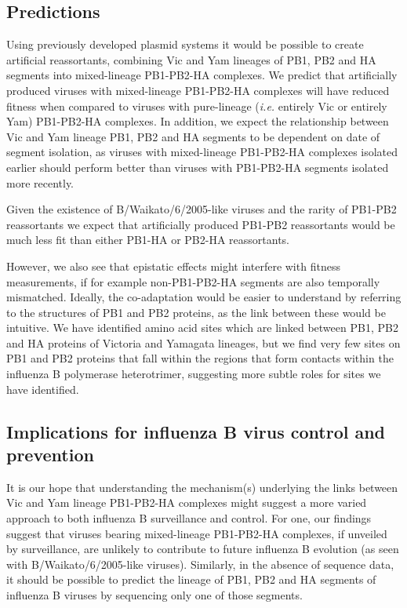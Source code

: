 \documentclass[11pt,oneside,letterpaper]{article}
\begin{document}
\subsection*{Predictions}
Using previously developed plasmid systems \cite{hoffmann2002} it would be possible to create artificial reassortants, combining Vic and Yam lineages of PB1, PB2 and HA segments into mixed-lineage PB1-PB2-HA complexes.
We predict that artificially produced viruses with mixed-lineage PB1-PB2-HA complexes will have reduced fitness when compared to viruses with pure-lineage (\textit{i.e.} entirely Vic or entirely Yam) PB1-PB2-HA complexes.
In addition, we expect the relationship between Vic and Yam lineage PB1, PB2 and HA segments to be dependent on date of segment isolation, as viruses with mixed-lineage PB1-PB2-HA complexes isolated earlier should perform better than viruses with PB1-PB2-HA segments isolated more recently.

Given the existence of B/Waikato/6/2005-like viruses and the rarity of PB1-PB2 reassortants we expect that artificially produced PB1-PB2 reassortants would be much less fit than either PB1-HA or PB2-HA reassortants.

However, we also see that epistatic effects might interfere with fitness measurements, if for example non-PB1-PB2-HA segments are also temporally mismatched.
Ideally, the co-adaptation would be easier to understand by referring to the structures of PB1 and PB2 proteins, as the link between these would be intuitive.
We have identified amino acid sites which are linked between PB1, PB2 and HA proteins of Victoria and Yamagata lineages, but we find very few sites on PB1 and PB2 proteins that fall within the regions that form contacts within the influenza B polymerase heterotrimer, suggesting more subtle roles for sites we have identified.

\subsection*{Implications for influenza B virus control and prevention}
It is our hope that understanding the mechanism(s) underlying the links between Vic and Yam lineage PB1-PB2-HA complexes might suggest a more varied approach to both influenza B surveillance and control.
For one, our findings suggest that viruses bearing mixed-lineage PB1-PB2-HA complexes, if unveiled by surveillance, are unlikely to contribute to future influenza B evolution (as seen with B/Waikato/6/2005-like viruses).
Similarly, in the absence of sequence data, it should be possible to predict the lineage of PB1, PB2 and HA segments of influenza B viruses by sequencing only one of those segments.
\end{document}
